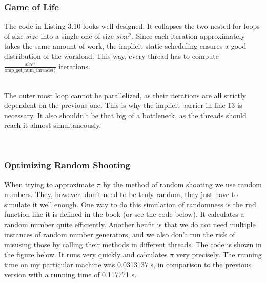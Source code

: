\documentclass[../../main.tex]{subfiles}
\begin{document}
\subsubsection{Game of Life}
The code in Listing 3.10 looks well designed.
It collapses the two nested for loops of size $size$ into a single one of size $size^2$.
Since each iteration approximately takes the same amount of work, the implicit static scheduling ensures a good distribution of the workload.
This way, every thread has to compute \( \frac{size^2}{\text{omp\_get\_num\_threads()}} \) iterations.

~\\
The outer most loop cannot be parallelized, as their iterations are all strictly dependent on the previous one.
This is why the implicit barrier in line 13 is necessary.
It also shouldn't be that big of a bottleneck, as the threads should reach it almost simultaneously.


~\\
\subsubsection{Optimizing Random Shooting}
When trying to approximate $\pi$ by the method of random shooting we use random numbers.
They, however, don't need to be truly random, they just have to simulate it well enough.
One way to do this simulation of randomness is the rnd function like it is defined in the book (or see the code below).
It calculates a random number quite efficiently.
Another benfit is that we do not need multiple instances of random number generators, and we also don't run the risk of misusing those by calling their methods in different threads.
The code is shown in the \hyperref[fig:calculate_pi_v2]{figure} below.
It runs very quickly and calculates $\pi$ very precisely.
The running time on my particular machine was 0.0313137 s, in comparison to the previous version with a running time of 0.117771 s.
\end{document}

